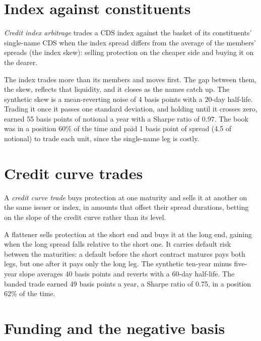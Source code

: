 \section{Index against constituents}

\begin{definition}\label{def:s2:credit-relative-value:index}
\emph{Credit index arbitrage} trades a CDS index against the basket of its constituents' single-name CDS when the index spread differs from the
average of the members' spreads (the index skew): selling protection on the cheaper side and buying it on the dearer.
\end{definition}

The index trades more than its members and moves first. The gap between them, the skew, reflects that liquidity, and it closes as the names catch up.
The synthetic skew is a mean-reverting noise of 4 basis points with a 20-day half-life. Trading it once it passes one standard deviation, and holding
until it crosses zero, earned 55 basis points of notional a year with a Sharpe ratio of 0.97. The book was in a position 60\% of the time and paid 1
basis point of spread (4.5 of notional) to trade each unit, since the single-name leg is costly.

\section{Credit curve trades}

\begin{definition}\label{def:s2:credit-relative-value:curve}
A \emph{credit curve trade} buys protection at one maturity and sells it at another on the same issuer or index, in amounts that offset their spread
durations, betting on the slope of the credit curve rather than its level.
\end{definition}

A flattener sells protection at the short end and buys it at the long end, gaining when the long spread falls relative to the short one. It carries
default risk between the maturities: a default before the short contract matures pays both legs, but one after it pays only the long leg. The synthetic
ten-year minus five-year slope averages 40 basis points and reverts with a 60-day half-life. The banded trade earned 49 basis points a year, a Sharpe
ratio of 0.75, in a position 62\% of the time.

\section{Funding and the negative basis}

